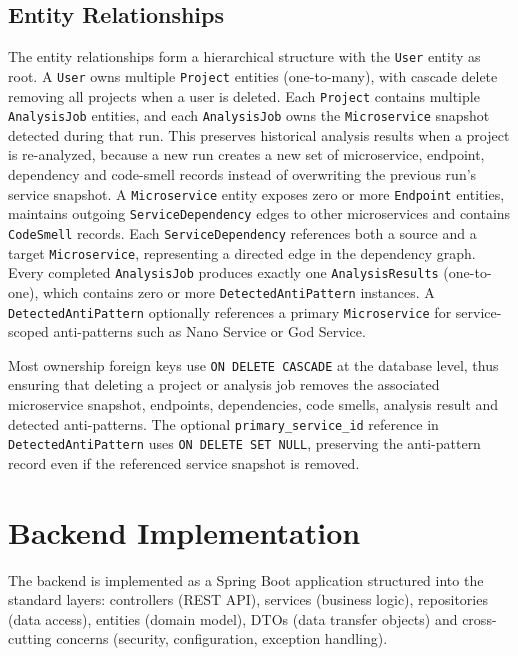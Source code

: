 \subsection{Entity Relationships}
\label{subsec:entity-relationships}

 \par The entity relationships form a hierarchical structure with the \texttt{User} entity as root. A \texttt{User} owns multiple \texttt{Project} entities (one-to-many), with cascade delete removing all projects when a user is deleted. Each \texttt{Project} contains multiple \texttt{AnalysisJob} entities, and each \texttt{AnalysisJob} owns the \texttt{Microservice} snapshot detected during that run. This preserves historical analysis results when a project is re-analyzed, because a new run creates a new set of microservice, endpoint, dependency and code-smell records instead of overwriting the previous run's service snapshot. A \texttt{Microservice} entity exposes zero or more \texttt{Endpoint} entities, maintains outgoing \texttt{ServiceDependency} edges to other microservices and contains \texttt{CodeSmell} records. Each \texttt{ServiceDependency} references both a source and a target \texttt{Microservice}, representing a directed edge in the dependency graph. Every completed \texttt{AnalysisJob} produces exactly one \texttt{A\-nal\-y\-sisResults} (one-to-one), which contains zero or more \texttt{DetectedAntiPattern} instances. A \texttt{DetectedAntiPattern} optionally references a primary \texttt{Micro\-service} for service-scoped anti-patterns such as Nano Service or God Service.

Most ownership foreign keys use \texttt{ON DELETE CASCADE} at the database level, thus ensuring that deleting a project or analysis job removes the associated microservice snapshot, endpoints, dependencies, code smells, analysis result and detected anti-patterns. The optional \texttt{primary\_service\_id} reference in \texttt{DetectedAntiPattern} uses \texttt{ON DELETE SET NULL}, preserving the anti-pattern record even if the referenced service snapshot is removed.


\section{Backend Implementation}
\label{sec:backend-impl}

 \par The backend is implemented as a Spring Boot application structured into the standard layers: controllers (REST API), services (business logic), repositories (data access), entities (domain model), DTOs (data transfer objects) and cross-cutting concerns (security, configuration, exception handling).

